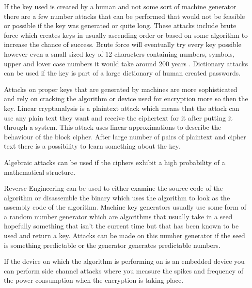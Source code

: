 If the key used is created by a human and not some sort of machine generator there are a few number attacks that can be performed that would not be feasible or possible if the key was generated or quite long. These attacks include brute force which creates keys in usually ascending order or based on some algorithm to increase the chance of success. Brute force will eventually try every key possible however even a small sized key of 12 characters containing numbers, symbols, upper and lover case numbers it would take around 200 years \cite{brute}. 
Dictionary attacks can be used if the key is part of a large dictionary of human created passwords. 

Attacks on proper keys that are generated by machines are more sophisticated and rely on cracking the algorithm or device used for encryption more so then the key.
Linear cryptanalysis \cite{cipher-attacks} is a plaintext attack which means that the attack can use any plain text they want and receive the ciphertext for it after putting it through a system. This attack uses linear approximations to describe the behaviour of the block cipher. After large number of pairs of plaintext and cipher text there is a possibility to learn something about the key.

Algebraic attacks \cite{cipher-attacks} can be used if the ciphers exhibit a high probability of a mathematical structure. 

Reverse Engineering \cite{cipher-attacks} can be used to either examine the source code of the algorithm or disassemble the binary which uses the algorithm to look as the assembly code of the algorithm.
Machine key generators usually use some form of a random number generator which are algorithms that usually take in a seed hopefully something that isn't the current time but that has been known to be used and return a key. Attacks can be made on this number generator if the seed is something predictable or the generator generates predictable numbers. 

If the device on which the algorithm is performing on is an embedded device you can perform side channel attacks \cite{cipher-attacks} where you measure the spikes and frequency of the power consumption when the encryption is taking place. 

%
%
%
%

